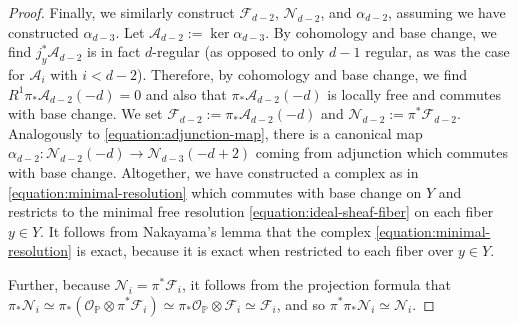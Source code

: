 \documentclass[12 pt]{amsart}
\newcommand{\rboxed}[1]{#1}
\theoremstyle{plain}
\theoremstyle{definition}
\theoremstyle{remark}
\numberwithin{equation}{section}
\newcommand\bp{\mathbb P}
\newcommand\sca{\mathscr A}
\newcommand\scf{\mathscr F}
\newcommand\scn{\mathscr N}
\newcommand\sco{\mathscr O}
\newcommand \ra{\rightarrow}
\begin{document}
\begin{proof}
			Finally, we similarly construct $\scf_{d-2}$,
			$\scn_{d-2}$, and $\alpha_{d-2}$, assuming we have
			constructed $\alpha_{d-3}$.  Let
$\rboxed{\sca_{d-2}} := \ker \alpha_{d-3}$.  By cohomology and base change, we
find $j_y^* \sca_{d-2}$ is in fact $d$-regular (as opposed to only $d-1$
regular, as was the case for $\sca_i$ with $i < d-2$).  Therefore, by cohomology
and base change, we find $R^1 \pi_* \sca_{d-2}(-d) = 0$ and also that $\pi_*
\sca_{d-2}(-d)$ is locally free and commutes with base change.  We set
$\rboxed{\scf_{d-2} }:= \pi_* \sca_{d-2}(-d)$ and $\rboxed{\scn_{d-2}} := \pi^*
\scf_{d-2}$.  Analogously to \eqref{equation:adjunction-map}, there is a canonical map
$\alpha_{d-2} :\scn_{d-2}(-d) \ra \scn_{d-3}(-d+2)$ coming from adjunction which
commutes with base change.  Altogether, we have constructed a complex as in
\eqref{equation:minimal-resolution} which commutes with base change on $Y$ and
restricts to the minimal free resolution \eqref{equation:ideal-sheaf-fiber} on
each fiber $y \in Y$.  It follows from Nakayama's lemma that the complex
\eqref{equation:minimal-resolution} is exact, because it is exact when
restricted to each fiber over $y \in Y$.

Further, because $\scn_i = \pi^* \scf_i$, it follows from the projection formula
that $\pi_* \scn_i \simeq \pi_*(\sco_\bp \otimes \pi^* \scf_i) \simeq \pi_*
\sco_\bp \otimes \scf_i \simeq \scf_i$, and so $\pi^* \pi_* \scn_i \simeq
\scn_i$.


\end{proof}
\end{document}

